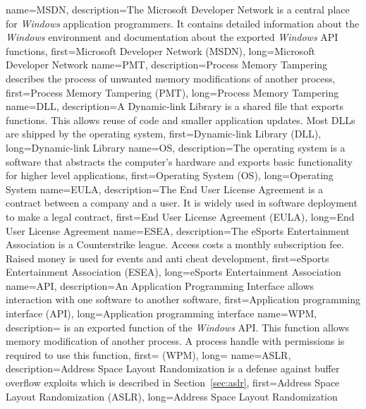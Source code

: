{
  name={MSDN},
  description={The Microsoft Developer Network is a central place for \emph{Windows} application programmers. It contains detailed information about the \emph{Windows} environment and documentation about the exported \emph{Windows} API functions},
  first={Microsoft Developer Network (MSDN)},
  long={Microsoft Developer Network}
}
{
  name={PMT},
  description={Process Memory Tampering describes the process of unwanted memory modifications of another process},
  first={Process Memory Tampering (PMT)},
  long={Process Memory Tampering}
}
{
  name={DLL},
  description={A Dynamic-link Library is a shared file that exports functions. This allows reuse of code and smaller application updates. Most DLLs are shipped by the operating system},
  first={Dynamic-link Library (DLL)},
  long={Dynamic-link Library}
}
{
  name={OS},
  description={The operating system is a software that abstracts the computer's hardware and exports basic functionality for higher level applications},
  first={Operating System (OS)},
  long={Operating System}
}
{
  name={EULA},
  description={The End User License Agreement is a contract between a company and a user. It is widely used in software deployment to make a legal contract},
  first={End User License Agreement (EULA)},
  long={End User License Agreement}
}
{
  name={ESEA},
  description={The eSports Entertainment Association is a Counterstrike league. Access costs a monthly subscription fee. Raised money is used for events and anti cheat development},
  first={eSports Entertainment Association (ESEA)},
  long={eSports Entertainment Association}
}
{
  name={API},
  description={An Application Programming Interface allows interaction with one software to another software},
  first={Application programming interface (API)},
  long={Application programming interface}
}
{
  name={WPM},
  description={ is an exported function of the \emph{Windows} API. This function allows memory modification of another process. A process handle with  permissions is required to use this function},
  first={ (WPM)},
  long={}
}
{
  name={ASLR},
  description={Address Space Layout Randomization is a defense against buffer overflow exploits which is described in Section~\ref{sec:aslr}},
  first={Address Space Layout Randomization (ASLR)},
  long={Address Space Layout Randomization}
}
